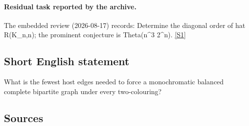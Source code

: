 \documentclass[11pt,a4paper]{article}
\newcommand{\sref}[2]{\hyperlink{source:#1:#2}{[S#2]}}
\begin{document}
\paragraph{Residual task reported by the archive.}

The embedded review (2026-08-17) records: Determine the diagonal order of hat R(K\_{n,n}); the prominent conjecture is Theta(n\textasciicircum{}3 2\textasciicircum{}n). \sref{statement}{1}

\subsection{Short English statement}

What is the fewest host edges needed to force a monochromatic balanced complete bipartite graph under every two-colouring?

\subsection{Sources}
\end{document}
